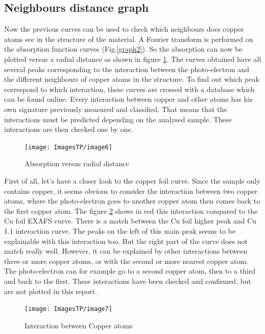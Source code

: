 \documentclass[11pt,a4paper,oneside]{report}
\begin{document}
\subsection{Neighbours distance graph}
Now the previous curves can be used to check which neighbours does copper atoms see in the structure of the material. A Fourier transform is performed on the absorption function curves (Fig.\ref{graph2}). So the absorption can now be plotted versus a radial distance as shown in figure \ref{graph3}. The curves obtained have all several peaks corresponding to the interaction between the photo-electron and the different neighbours of copper atoms in the structure. To find out which peak correspond to which interaction, these curves are crossed with a database which can be found online. Every interaction between copper and other atoms has his own signature previously measured and classified. That means that the interactions must be predicted depending on the analysed sample. These interactions are then checked one by one.



\begin{figure}[H]
    \begin{center}
        \texttt{[image: ImagesTP/image6]}
        \caption{Absorption versus radial distance}
        \label{graph3}
    \end{center}
\end{figure}


First of all, let’s have a closer look to the copper foil curve. Since the sample only contains copper, it seems obvious to consider the interaction between two copper atoms, where the photo-electron goes to another copper atom then comes back to the first copper atom. The figure \ref{graph4} shows in red this interaction compared to the Cu foil EXAFS curve. There is a match between the Cu foil higher peak and Cu 1.1 interaction curve. The peaks on the left of this main peak seems to be explainable with this interaction too. But the right part of the curve does not match really well. However, it can be explained by other interactions between three or more copper atoms, or with the second or more nearest copper atom. The photo-electron can for example go to a second copper atom, then to a third and back to the first. These interactions have been checked and confirmed, but are not plotted in this report.

\begin{figure}[H]
    \begin{center}
        \texttt{[image: ImagesTP/image7]}
        \caption{Interaction between Copper atoms}
        \label{graph4}
    \end{center}
\end{figure}
\end{document}
